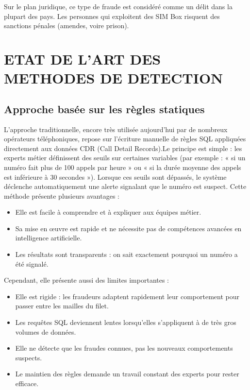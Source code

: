 \documentclass[12pt, oneside, a4paper]{report}
\begin{document}
Sur le plan juridique, ce type de fraude est considéré comme un délit dans la plupart des pays. Les personnes qui exploitent des SIM Box risquent des sanctions pénales (amendes, voire prison).

\section{ETAT DE L'ART DES METHODES DE DETECTION}

\subsection{Approche basée sur les règles statiques}
L'approche traditionnelle, encore très utilisée aujourd'hui par de nombreux opérateurs téléphoniques, repose sur l'écriture manuelle de règles SQL appliquées directement aux données CDR (Call Detail Records).Le principe est simple : les experts métier définissent des seuils sur certaines variables (par exemple : « si un numéro fait plus de 100 appels par heure » ou « si la durée moyenne des appels est inférieure à 30 secondes »). Lorsque ces seuils sont dépassés, le système déclenche automatiquement une alerte signalant que le numéro est suspect.
\newpage
Cette méthode présente plusieurs avantages :
\begin{itemize}
\item Elle est facile à comprendre et à expliquer aux équipes métier.
\item Sa mise en œuvre est rapide et ne nécessite pas de compétences avancées en          \vspace{0.3cm}intelligence artificielle.
\item Les résultats sont transparents : on sait exactement pourquoi un numéro a été signalé.
\end{itemize}

Cependant, elle présente aussi des limites importantes :
\begin{itemize}
\item Elle est rigide : les fraudeurs adaptent rapidement leur comportement pour passer entre les mailles du filet.
\item Les requêtes SQL deviennent lentes lorsqu'elles s'appliquent à de très gros volumes de données.
\item Elle ne détecte que les fraudes connues, pas les nouveaux comportements suspects.
\item Le maintien des règles demande un travail constant des experts pour rester efficace.
\end{itemize}
\end{document}
